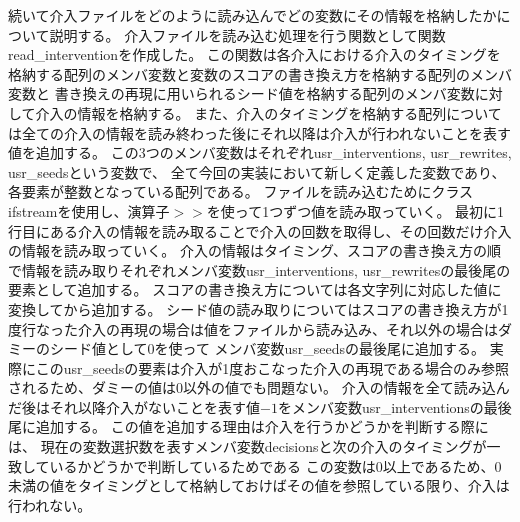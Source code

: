 続いて介入ファイルをどのように読み込んでどの変数にその情報を格納したかについて説明する。
介入ファイルを読み込む処理を行う関数として関数read\_interventionを作成した。
この関数は各介入における介入のタイミングを格納する配列のメンバ変数と変数のスコアの書き換え方を格納する配列のメンバ変数と
書き換えの再現に用いられるシード値を格納する配列のメンバ変数に対して介入の情報を格納する。
また、介入のタイミングを格納する配列については全ての介入の情報を読み終わった後にそれ以降は介入が行われないことを表す値を追加する。
この3つのメンバ変数はそれぞれusr\_interventions, usr\_rewrites, usr\_seedsという変数で、
全て今回の実装において新しく定義した変数であり、各要素が整数となっている配列である。
ファイルを読み込むためにクラスifstreamを使用し、演算子$>>$を使って1つずつ値を読み取っていく。
最初に1行目にある介入の情報を読み取ることで介入の回数を取得し、その回数だけ介入の情報を読み取っていく。
介入の情報はタイミング、スコアの書き換え方の順で情報を読み取りそれぞれメンバ変数usr\_interventions, usr\_rewritesの最後尾の要素として追加する。
スコアの書き換え方については各文字列に対応した値に変換してから追加する。
シード値の読み取りについてはスコアの書き換え方が1度行なった介入の再現の場合は値をファイルから読み込み、それ以外の場合はダミーのシード値として0を使って
メンバ変数usr\_seedsの最後尾に追加する。
実際にこのusr\_seedsの要素は介入が1度おこなった介入の再現である場合のみ参照されるため、ダミーの値は0以外の値でも問題ない。
介入の情報を全て読み込んだ後はそれ以降介入がないことを表す値$-1$をメンバ変数usr\_interventionsの最後尾に追加する。
この値を追加する理由は介入を行うかどうかを判断する際には、
現在の変数選択数を表すメンバ変数decisionsと次の介入のタイミングが一致しているかどうかで判断しているためである
この変数は0以上であるため、0未満の値をタイミングとして格納しておけばその値を参照している限り、介入は行われない。

